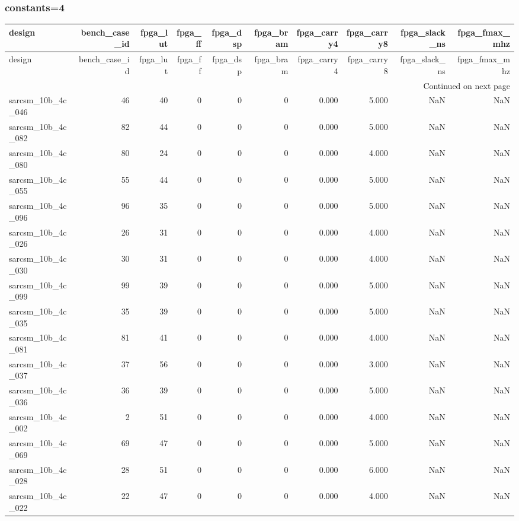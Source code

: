 \documentclass{article}
\begin{document}
\subsubsection*{constants=4}
\begin{longtable}{lrrrrrrrrr}
\toprule
design & bench\_case\_id & fpga\_lut & fpga\_ff & fpga\_dsp & fpga\_bram & fpga\_carry4 & fpga\_carry8 & fpga\_slack\_ns & fpga\_fmax\_mhz \\
\midrule
\endfirsthead
\toprule
design & bench\_case\_id & fpga\_lut & fpga\_ff & fpga\_dsp & fpga\_bram & fpga\_carry4 & fpga\_carry8 & fpga\_slack\_ns & fpga\_fmax\_mhz \\
\midrule
\endhead
\midrule
\multicolumn{10}{r}{Continued on next page} \\
\midrule
\endfoot
\bottomrule
\endlastfoot
sarcsm\_10b\_4c\_046 & 46 & 40 & 0 & 0 & 0 & 0.000 & 5.000 & NaN & NaN \\
sarcsm\_10b\_4c\_082 & 82 & 44 & 0 & 0 & 0 & 0.000 & 5.000 & NaN & NaN \\
sarcsm\_10b\_4c\_080 & 80 & 24 & 0 & 0 & 0 & 0.000 & 4.000 & NaN & NaN \\
sarcsm\_10b\_4c\_055 & 55 & 44 & 0 & 0 & 0 & 0.000 & 5.000 & NaN & NaN \\
sarcsm\_10b\_4c\_096 & 96 & 35 & 0 & 0 & 0 & 0.000 & 5.000 & NaN & NaN \\
sarcsm\_10b\_4c\_026 & 26 & 31 & 0 & 0 & 0 & 0.000 & 4.000 & NaN & NaN \\
sarcsm\_10b\_4c\_030 & 30 & 31 & 0 & 0 & 0 & 0.000 & 4.000 & NaN & NaN \\
sarcsm\_10b\_4c\_099 & 99 & 39 & 0 & 0 & 0 & 0.000 & 5.000 & NaN & NaN \\
sarcsm\_10b\_4c\_035 & 35 & 39 & 0 & 0 & 0 & 0.000 & 5.000 & NaN & NaN \\
sarcsm\_10b\_4c\_081 & 81 & 41 & 0 & 0 & 0 & 0.000 & 4.000 & NaN & NaN \\
sarcsm\_10b\_4c\_037 & 37 & 56 & 0 & 0 & 0 & 0.000 & 3.000 & NaN & NaN \\
sarcsm\_10b\_4c\_036 & 36 & 39 & 0 & 0 & 0 & 0.000 & 5.000 & NaN & NaN \\
sarcsm\_10b\_4c\_002 & 2 & 51 & 0 & 0 & 0 & 0.000 & 4.000 & NaN & NaN \\
sarcsm\_10b\_4c\_069 & 69 & 47 & 0 & 0 & 0 & 0.000 & 5.000 & NaN & NaN \\
sarcsm\_10b\_4c\_028 & 28 & 51 & 0 & 0 & 0 & 0.000 & 6.000 & NaN & NaN \\
sarcsm\_10b\_4c\_022 & 22 & 47 & 0 & 0 & 0 & 0.000 & 4.000 & NaN & NaN \\

\end{longtable}
\end{document}
